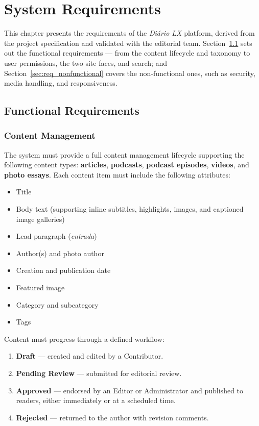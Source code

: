 %
%
\chapter{System Requirements} \label{cap:requirements}

This chapter presents the requirements of the \textit{Diário LX} platform, derived from the
project specification and validated with the editorial team. Section~\ref{sec:req_functional}
sets out the functional requirements --- from the content lifecycle and taxonomy to user
permissions, the two site faces, and search; and Section~\ref{sec:req_nonfunctional} covers
the non-functional ones, such as security, media handling, and responsiveness.

\section{Functional Requirements} \label{sec:req_functional}

\subsection{Content Management} \label{sec:req_content}

The system must provide a full content management lifecycle supporting the following content types: \textbf{articles}, \textbf{podcasts}, \textbf{podcast episodes}, \textbf{videos}, and \textbf{photo essays}. Each content item must include the following attributes:

\begin{itemize}
      \item Title
      \item Body text (supporting inline subtitles, highlights, images, and captioned image galleries)
      \item Lead paragraph (\textit{entrada})
      \item Author(s) and photo author
      \item Creation and publication date
      \item Featured image
      \item Category and subcategory
      \item Tags
\end{itemize}

Content must progress through a defined workflow:

\begin{enumerate}
      \item \textbf{Draft} — created and edited by a Contributor.
      \item \textbf{Pending Review} — submitted for editorial review.
      \item \textbf{Approved} — endorsed by an Editor or Administrator and published to
            readers, either immediately or at a scheduled time.
      \item \textbf{Rejected} — returned to the author with revision comments.
\end{enumerate}

